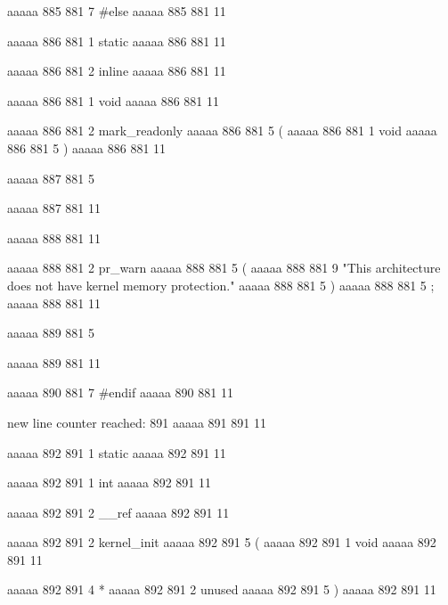 aaaaa 885 881
7
#else
aaaaa 885 881
11


aaaaa 886 881
1
static
aaaaa 886 881
11
 
aaaaa 886 881
2
inline
aaaaa 886 881
11
 
aaaaa 886 881
1
void
aaaaa 886 881
11
 
aaaaa 886 881
2
mark_readonly
aaaaa 886 881
5
(
aaaaa 886 881
1
void
aaaaa 886 881
5
)
aaaaa 886 881
11


aaaaa 887 881
5
{
aaaaa 887 881
11


aaaaa 888 881
11
	
aaaaa 888 881
2
pr_warn
aaaaa 888 881
5
(
aaaaa 888 881
9
"This architecture does not have kernel memory protection.\n"
aaaaa 888 881
5
)
aaaaa 888 881
5
;
aaaaa 888 881
11


aaaaa 889 881
5
}
aaaaa 889 881
11


aaaaa 890 881
7
#endif
aaaaa 890 881
11


new line counter reached: 891
aaaaa 891 891
11


aaaaa 892 891
1
static
aaaaa 892 891
11
 
aaaaa 892 891
1
int
aaaaa 892 891
11
 
aaaaa 892 891
2
__ref
aaaaa 892 891
11
 
aaaaa 892 891
2
kernel_init
aaaaa 892 891
5
(
aaaaa 892 891
1
void
aaaaa 892 891
11
 
aaaaa 892 891
4
*
aaaaa 892 891
2
unused
aaaaa 892 891
5
)
aaaaa 892 891
11


